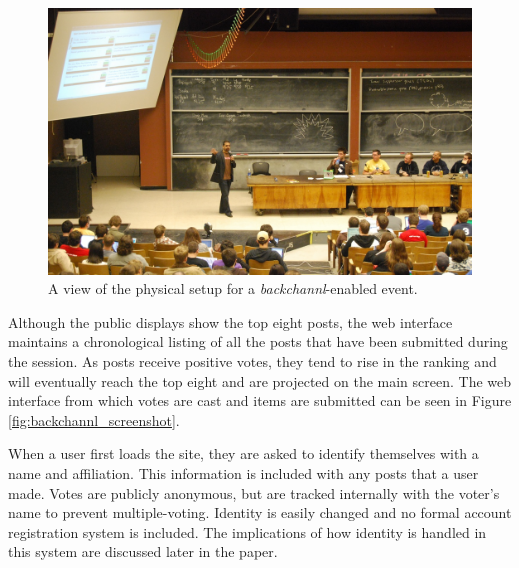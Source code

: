\begin{figure}[t]
	\includegraphics{figures/backchannl/roflcon_photo.jpg}
	\caption{A view of the physical setup for a \emph{backchannl}-enabled event.}
	\label{fig:backchannl_physical}
\end{figure}

Although the public displays show the top eight posts, the web interface maintains a chronological listing of all the posts that have been submitted during the session. As posts receive positive votes, they tend to rise in the ranking and will eventually reach the top eight and are projected on the main screen. The web interface from which votes are cast and items are submitted can be seen in Figure \ref{fig:backchannl_screenshot}.

When a user first loads the site, they are asked to identify themselves with a name and affiliation. This information is included with any posts that a user made. Votes are publicly anonymous, but are tracked internally with the voter's name to prevent multiple-voting. Identity is easily changed and no formal account registration system is included. The implications of how identity is handled in this system are discussed later in the paper. 

